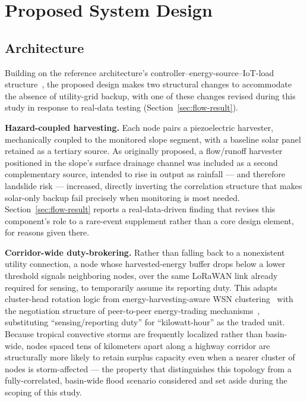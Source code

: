 \documentclass[electronics,article,submit,moreauthors]{Definitions/mdpi}
\begin{document}
\section{Proposed System Design}
\label{sec:design}

\subsection{Architecture}

Building on the reference architecture's controller--energy-source--IoT-load structure~\cite{ref101}, the proposed design makes two structural changes to accommodate the absence of utility-grid backup, with one of these changes revised during this study in response to real-data testing (Section~\ref{sec:flow-result}).

\textbf{Hazard-coupled harvesting.} Each node pairs a piezoelectric harvester, mechanically coupled to the monitored slope segment, with a baseline solar panel retained as a tertiary source. As originally proposed, a flow/runoff harvester positioned in the slope's surface drainage channel was included as a second complementary source, intended to rise in output as rainfall --- and therefore landslide risk --- increased, directly inverting the correlation structure that makes solar-only backup fail precisely when monitoring is most needed. Section~\ref{sec:flow-result} reports a real-data-driven finding that revises this component's role to a rare-event supplement rather than a core design element, for reasons given there.

\textbf{Corridor-wide duty-brokering.} Rather than falling back to a nonexistent utility connection, a node whose harvested-energy buffer drops below a lower threshold signals neighboring nodes, over the same LoRaWAN link already required for sensing, to temporarily assume its reporting duty. This adapts cluster-head rotation logic from energy-harvesting-aware WSN clustering~\cite{ref113} with the negotiation structure of peer-to-peer energy-trading mechanisms~\cite{ref132}, substituting ``sensing/reporting duty'' for ``kilowatt-hour'' as the traded unit. Because tropical convective storms are frequently localized rather than basin-wide, nodes spaced tens of kilometers apart along a highway corridor are structurally more likely to retain surplus capacity even when a nearer cluster of nodes is storm-affected --- the property that distinguishes this topology from a fully-correlated, basin-wide flood scenario considered and set aside during the scoping of this study.
\end{document}
